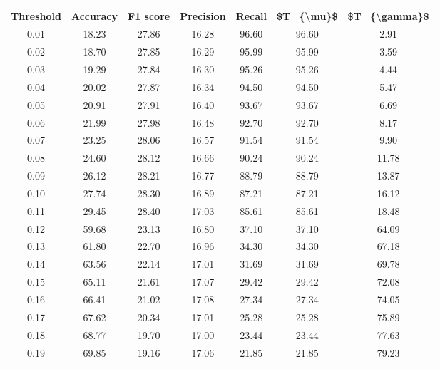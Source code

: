 \begin{tabular}{|c|c|c|c|c|c|c|}
\toprule
 Threshold &  Accuracy &  F1 score &  Precision &  Recall &  \$T\_\{\textbackslash mu\}\$ &  \$T\_\{\textbackslash gamma\}\$ \\
\hline
      0.01 &     18.23 &     27.86 &      16.28 &   96.60 &      96.60 &          2.91 \\
      0.02 &     18.70 &     27.85 &      16.29 &   95.99 &      95.99 &          3.59 \\
      0.03 &     19.29 &     27.84 &      16.30 &   95.26 &      95.26 &          4.44 \\
      0.04 &     20.02 &     27.87 &      16.34 &   94.50 &      94.50 &          5.47 \\
      0.05 &     20.91 &     27.91 &      16.40 &   93.67 &      93.67 &          6.69 \\
      0.06 &     21.99 &     27.98 &      16.48 &   92.70 &      92.70 &          8.17 \\
      0.07 &     23.25 &     28.06 &      16.57 &   91.54 &      91.54 &          9.90 \\
      0.08 &     24.60 &     28.12 &      16.66 &   90.24 &      90.24 &         11.78 \\
      0.09 &     26.12 &     28.21 &      16.77 &   88.79 &      88.79 &         13.87 \\
      0.10 &     27.74 &     28.30 &      16.89 &   87.21 &      87.21 &         16.12 \\
      0.11 &     29.45 &     28.40 &      17.03 &   85.61 &      85.61 &         18.48 \\
      0.12 &     59.68 &     23.13 &      16.80 &   37.10 &      37.10 &         64.09 \\
      0.13 &     61.80 &     22.70 &      16.96 &   34.30 &      34.30 &         67.18 \\
      0.14 &     63.56 &     22.14 &      17.01 &   31.69 &      31.69 &         69.78 \\
      0.15 &     65.11 &     21.61 &      17.07 &   29.42 &      29.42 &         72.08 \\
      0.16 &     66.41 &     21.02 &      17.08 &   27.34 &      27.34 &         74.05 \\
      0.17 &     67.62 &     20.34 &      17.01 &   25.28 &      25.28 &         75.89 \\
      0.18 &     68.77 &     19.70 &      17.00 &   23.44 &      23.44 &         77.63 \\
      0.19 &     69.85 &     19.16 &      17.06 &   21.85 &      21.85 &         79.23 \\

\end{tabular}
